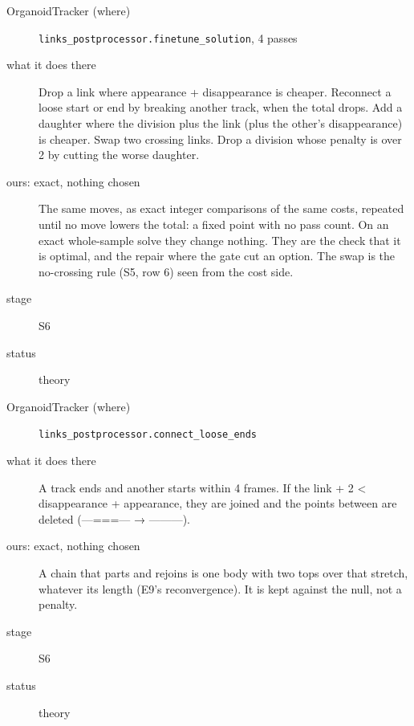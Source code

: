 \begin{description}
\item[{OrganoidTracker (where)}] \texttt{links\_\allowbreak{}postprocessor.\allowbreak{}finetune\_\allowbreak{}solution}, 4 passes
\item[{what it does there}] Drop a link where appearance + disappearance is cheaper. Reconnect a loose start or end by breaking another track, when the total drops. Add a daughter where the division plus the link (plus the other's disappearance) is cheaper. Swap two crossing links. Drop a division whose penalty is over 2 by cutting the worse daughter.
\item[{ours: exact, nothing chosen}] The same moves, as exact integer comparisons of the same costs, repeated until no move lowers the total: a fixed point with no pass count. On an exact whole-sample solve they change nothing. They are the check that it is optimal, and the repair where the gate cut an option. The swap is the no-crossing rule (S5, row 6) seen from the cost side.
\item[{stage}] S6
\item[{status}] theory
\end{description}

\begin{description}
\item[{OrganoidTracker (where)}] \texttt{links\_\allowbreak{}postprocessor.\allowbreak{}connect\_\allowbreak{}loose\_\allowbreak{}ends}
\item[{what it does there}] A track ends and another starts within 4 frames. If the link + 2 < disappearance + appearance, they are joined and the points between are deleted (---===--- → ---------).
\item[{ours: exact, nothing chosen}] A chain that parts and rejoins is one body with two tops over that stretch, whatever its length (E9's reconvergence). It is kept against the null, not a penalty.
\item[{stage}] S6
\item[{status}] theory
\end{description}

